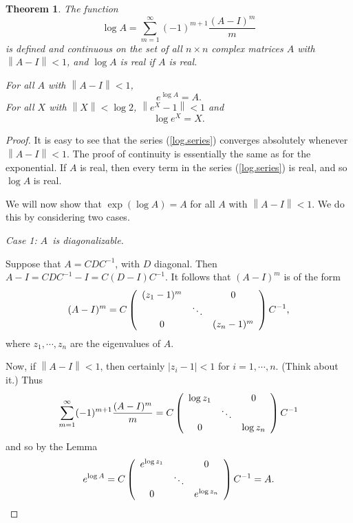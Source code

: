 \documentclass{amsbook}
\theoremstyle{plain}
\newtheorem{theorem}{Theorem}
\numberwithin{equation}{chapter}
\numberwithin{theorem}{chapter}
\begin{document}
\begin{theorem}
\label{logarithm}The function
\begin{equation}
\log A=\sum_{m=1}^{\infty}(-1)^{m+1}\frac{(A-I)^{m}}{m}\label{log.series}%
\end{equation}
is defined and continuous on the set of all $n\times n$ complex matrices $A$
with $\left\|  A-I\right\|  <1$, and $\log A$ is real if $A$ is real.

For all $A$ with $\left\|  A-I\right\|  <1$,
\[
e^{\log A}=A\text{.}%
\]
For all $X$ with $\left\|  X\right\|  <\log2$, $\left\|  e^{X}-1\right\|  <1$
and
\[
\log e^{X}=X\text{.}%
\]
\end{theorem}

\begin{proof}
It is easy to see that the series (\ref{log.series}) converges absolutely
whenever $\left\|  A-I\right\|  <1$. The proof of continuity is essentially
the same as for the exponential. If $A$ is real, then every term in the series
(\ref{log.series}) is real, and so $\log A$ is real.

We will now show that $\exp(\log A)=A$ for all $A$ with $\left\|  A-I\right\|
<1$. We do this by considering two cases.

\textit{Case 1: }$A$\textit{\ is diagonalizable.}

Suppose that $A=CDC^{-1}$, with $D$ diagonal. Then $A-I=CDC^{-1}%
-I=C(D-I)C^{-1}$. It follows that $(A-I)^{m}$ is of the form
\[
(A-I)^{m}=C\left(
\begin{array}
[c]{ccc}%
(z_{1}-1)^{m} &  & 0\\
& \ddots & \\
0 &  & (z_{n}-1)^{m}%
\end{array}
\right)  C^{-1}\text{,}%
\]
where $z_{1},\cdots,z_{n}$ are the eigenvalues of $A$.

Now, if $\left\|  A-I\right\|  <1$, then certainly $\left|  z_{i}-1\right|
<1$ for $i=1,\cdots,n$. (Think about it.) Thus
\[
\sum_{m=1}^{\infty}(-1)^{m+1}\frac{(A-I)^{m}}{m}=C\left(
\begin{array}
[c]{ccc}%
\log z_{1} &  & 0\\
& \ddots & \\
0 &  & \log z_{n}%
\end{array}
\right)  C^{-1}%
\]
and so by the Lemma
\[
e^{\log A}=C\left(
\begin{array}
[c]{ccc}%
e^{\log z_{1}} &  & 0\\
& \ddots & \\
0 &  & e^{\log z_{n}}%
\end{array}
\right)  C^{-1}=A\text{.}%
\]


\end{proof}
\end{document}
